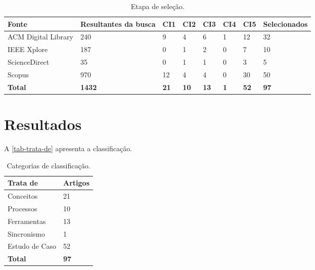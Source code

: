\documentclass[
article,			%
11pt,				%
oneside,			%
a4paper,			%
english,			%
brazil,				%
sumario=tradicional
]{abntex2}
\begin{document}
  \begin{table}[htb]
    \ABNTEXfontereduzida
    \caption[Etapa de seleção]{Etapa de seleção.}
    \label{tab-article-selection}
    \begin{tabular}{p{3.0cm}|p{2.0cm}|p{1.0cm}|p{1.0cm}|p{1.0cm}|p{1.0cm}|p{1.0cm}|p{2.0cm}}
      \textbf{Fonte} & \textbf{Resultantes da busca} & \textbf{CI1} & \textbf{CI2} & \textbf{CI3} & \textbf{CI4} & \textbf{CI5} & \textbf{Selecionados}  \\
      \hline
      ACM Digital Library & 240 & 9 & 4 & 6 & 1 & 12 & 32 \\
      \hline
      IEEE Xplore & 187 & 0 & 1 & 2 & 0 & 7 & 10 \\
      \hline
      ScienceDirect & 35 & 0 & 1 & 1 & 0 & 3 & 5 \\
      \hline
      Scopus & 970 & 12 & 4 & 4 & 0 & 30 & 50 \\
      \hline
      \textbf{Total} & \textbf{1432} & \textbf{21} & \textbf{10} & \textbf{13} & \textbf{1} & \textbf{52} & \textbf{97} \\
    \end{tabular}
  \end{table}

  \section{Resultados}

  A \autoref{tab-trata-de} apresenta a classificação.

  \begin{table}[htb]
    \ABNTEXfontereduzida
    \caption[Categorias de classificação]{Categorias de classificação.}
    \label{tab-trata-de}
    \begin{center}
      \begin{tabular}{p{3.0cm}|p{2.0cm}}
        \textbf{Trata de} & \textbf{Artigos} \\
        \hline
        Conceitos & 21 \\
        \hline
        Processos & 10 \\
        \hline
        Ferramentas & 13\\
        \hline
        Sincronismo & 1\\
        \hline
        Estudo de Caso & 52\\
        \hline
        \textbf{Total} & \textbf{97} \\
      \end{tabular}
    \end{center}
  \end{table}
\end{document}
